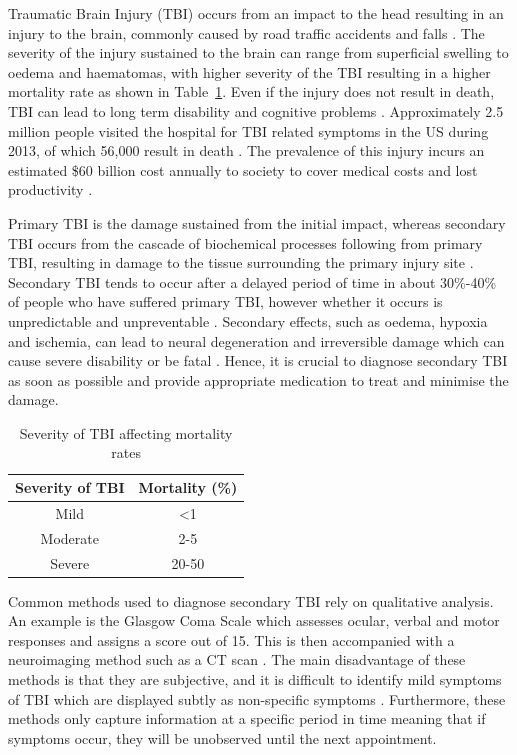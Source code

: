 Traumatic Brain Injury (TBI) occurs from an impact to the head resulting in an injury to the brain, commonly caused by road traffic accidents and falls \cite{Langlois2006}. The severity of the injury sustained to the brain can range from superficial swelling to oedema and haematomas, with higher severity of the TBI resulting in a higher mortality rate as shown in Table~\ref{table:severity of TBI}. Even if the injury does not result in death, TBI can lead to long term disability and cognitive problems \cite{WorldHealthOrganisation2006}. Approximately 2.5 million people visited the hospital for TBI related symptoms in the US during 2013, of which 56,000 result in death \cite{Taylor2017}. The prevalence of this injury incurs an estimated \$60 billion cost annually to society to cover medical costs and lost productivity \cite{Finkelstein2009}. 

Primary TBI is the damage sustained from the initial impact, whereas secondary TBI occurs from the cascade of biochemical processes following from primary TBI, resulting in damage to the tissue surrounding the primary injury site \cite{Norton2008}. Secondary TBI tends to occur after a delayed period of time in about 30\%-40\% of people who have suffered primary TBI, however whether it occurs is unpredictable and unpreventable \cite{Pagkalos2017}. Secondary effects, such as oedema, hypoxia and ischemia, can lead to neural degeneration and irreversible damage which can cause severe disability or be fatal \cite{Murthy2005}. Hence, it is crucial to diagnose secondary TBI as soon as possible and provide appropriate medication to treat and minimise the damage.

\begin{table}[H]
\centering
\begin{tabular}{||c c||} 
 \hline
 Severity of TBI & Mortality (\%) \\ [0.5ex] 
 \hline\hline
 Mild & \textless 1 \\ 
 Moderate & 2-5 \\
 Severe & 20-50 \\
 \hline
\end{tabular}
\caption{Severity of TBI affecting mortality rates \cite{WorldHealthOrganisation2006}}
\label{table:severity of TBI}
\end{table}

Common methods used to diagnose secondary TBI rely on qualitative analysis. An example is the Glasgow Coma Scale which assesses ocular, verbal and motor responses and assigns a score out of 15. This is then accompanied with a neuroimaging method such as a CT scan \cite{WorldHealthOrganisation2006}. The main disadvantage of these methods is that they are subjective, and it is difficult to identify mild symptoms of TBI which are displayed subtly as non-specific symptoms \cite{Bettermann2012}. Furthermore, these methods only capture information at a specific period in time meaning that if symptoms occur, they will be unobserved until the next appointment. 

